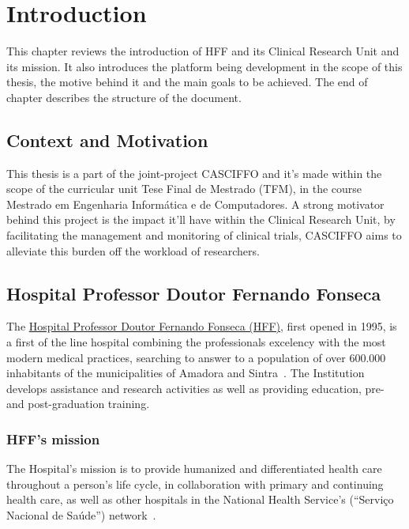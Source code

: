 \setlength{\headheight}{14.49998pt}
\chapter{Introduction}
\label{ch:intro}
This chapter reviews the introduction of HFF and its Clinical Research Unit and its mission. It also introduces the platform being development in the scope of this thesis, the motive behind it and the main goals to be achieved. The end of chapter describes the structure of the document.

\section{Context and Motivation}
This thesis is a part of the joint-project CASCIFFO and it's made within the scope of the curricular unit Tese Final de Mestrado (TFM), in the course Mestrado em Engenharia Informática e de Computadores. A strong motivator behind this project is the impact it'll have within the Clinical Research Unit, by facilitating the management and monitoring of clinical trials, CASCIFFO aims to alleviate this burden off the workload of researchers.

\section{Hospital Professor Doutor Fernando Fonseca}
\label{ch:intro:sec:intro}

The \href{https://hff.min-saude.pt/}{Hospital Professor Doutor Fernando Fonseca (HFF)}, first opened in 1995, is a first of the line hospital combining the professionals excelency with the most modern medical practices, searching to answer to a population of over 600.000 inhabitants of the municipalities of Amadora and Sintra~\cite{hff-intro}. The Institution develops assistance and research activities as well as providing education, pre- and post-graduation training.

\subsection{HFF's mission}
The Hospital's mission is to provide humanized and differentiated health
care throughout a person's life cycle, in collaboration with primary and
continuing health care, as well as other hospitals in the National
Health Service's (``Serviço Nacional de Saúde'') network~\cite{hff-uic}.

